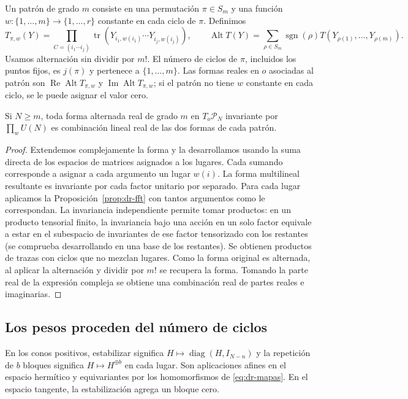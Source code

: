 Un patrón de grado $m$ consiste en una permutación $\pi\in S_m$ y una función $w:\{1,\ldots,m\}\to\{1,\ldots,r\}$ constante en cada ciclo de $\pi$. Definimos
\begin{equation}
 T_{\pi,w}(Y)=\prod_{C=(i_1\cdots i_j)}
 \operatorname{tr}(Y_{i_1,w(i_1)}\cdots Y_{i_j,w(i_j)}),\qquad
 \operatorname{Alt}T(Y)=\sum_{\rho\in S_m}\operatorname{sgn}(\rho)T(Y_{\rho(1)},\ldots,Y_{\rho(m)}).
 \label{eq:dr-alt}
\end{equation}
Usamos alternación sin dividir por $m!$. El número de ciclos de $\pi$, incluidos los puntos fijos, es $j(\pi)$ y pertenece a $\{1,\ldots,m\}$. Las formas reales en $o$ asociadas al patrón son $\operatorname{Re}\operatorname{Alt}T_{\pi,w}$ y $\operatorname{Im}\operatorname{Alt}T_{\pi,w}$; si el patrón no tiene $w$ constante en cada ciclo, se le puede asignar el valor cero.

\begin{proposicion}
\label{prop:dr-patrones}
Si $N\ge m$, toda forma alternada real de grado $m$ en $T_o\mathcal P_N$ invariante por $\prod_w U(N)$ es combinación lineal real de las dos formas de cada patrón.
\end{proposicion}
\begin{proof}
Extendemos complejamente la forma y la desarrollamos usando la suma directa de los espacios de matrices asignados a los lugares. Cada sumando corresponde a asignar a cada argumento un lugar $w(i)$. La forma multilineal resultante es invariante por cada factor unitario por separado. Para cada lugar aplicamos la Proposición~\ref{prop:dr-fft} con tantos argumentos como le correspondan. La invariancia independiente permite tomar productos: en un producto tensorial finito, la invariancia bajo una acción en un solo factor equivale a estar en el subespacio de invariantes de ese factor tensorizado con los restantes (se comprueba desarrollando en una base de los restantes). Se obtienen productos de trazas con ciclos que no mezclan lugares. Como la forma original es alternada, al aplicar la alternación y dividir por $m!$ se recupera la forma. Tomando la parte real de la expresión compleja se obtiene una combinación real de partes reales e imaginarias.
\end{proof}

\subsection{Los pesos proceden del número de ciclos}

En los conos positivos, estabilizar significa $H\mapsto\operatorname{diag}(H,I_{N-n})$ y la repetición de $b$ bloques significa $H\mapsto H^{\oplus b}$ en cada lugar. Son aplicaciones afines en el espacio hermítico y equivariantes por los homomorfismos de \eqref{eq:dr-mapas}. En el espacio tangente, la estabilización agrega un bloque cero.

